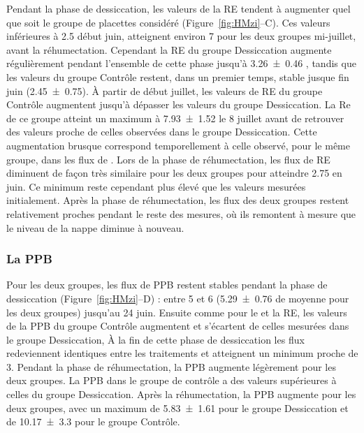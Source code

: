Pendant la phase de dessiccation, les valeurs de la RE tendent à augmenter quel que soit le groupe de placettes considéré (Figure~\ref{fig:HMzi}--C).
Ces valeurs inférieures à \SI{2.5}{\uml} début juin, atteignent environ \SI{7}{\uml} pour les deux groupes mi-juillet, avant la réhumectation.
Cependant la RE du groupe Dessiccation augmente régulièrement pendant l'ensemble de cette phase jusqu'à \SI{3.26(046)}{\uml} , tandis que les valeurs du groupe Contrôle restent, dans un premier temps, stable jusque fin juin (\SI{2.45(075)}{\uml}).
À partir de début juillet, les valeurs de RE du groupe Contrôle augmentent jusqu'à dépasser les valeurs du groupe Dessiccation.
La Re de ce groupe atteint un maximum à \SI{7.93(152)}{\uml} le 8 juillet avant de retrouver des valeurs proche de celles observées dans le groupe Dessiccation.
Cette augmentation brusque correspond temporellement à celle observé, pour le même groupe, dans les flux de \chh.
Lors de la phase de réhumectation, les flux de RE diminuent de façon très similaire pour les deux groupes pour atteindre \SI{2.75}{\uml} en juin.
Ce minimum reste cependant plus élevé que les valeurs mesurées initialement.
Après la phase de réhumectation, les flux des deux groupes restent relativement proches pendant le reste des mesures, où ils remontent à mesure que le niveau de la nappe diminue à nouveau.

\subsubsection{La PPB}

Pour les deux groupes, les flux de PPB restent stables pendant la phase de dessiccation (Figure~\ref{fig:HMzi}--D) :
entre 5 et \SI{6}{\uml} (\SI{5.29(076)}{\uml} de moyenne pour les deux groupes) jusqu'au 24 juin.
Ensuite comme pour le \chh et la RE, les valeurs de la PPB du groupe Contrôle augmentent et s'écartent de celles mesurées dans le groupe Dessiccation,
À la fin de cette phase de dessiccation les flux redeviennent identiques entre les traitements et atteignent un minimum proche de \SI{3}{\uml}.
Pendant la phase de réhumectation, la PPB augmente légèrement pour les deux groupes.
La PPB dans le groupe de contrôle a des valeurs supérieures à celles du groupe Dessiccation.
Après la réhumectation, la PPB augmente pour les deux groupes, avec un maximum de \SI{5.83(161)}{\uml} pour le groupe Dessiccation et de \SI{10.17(330)}{\uml} pour le groupe Contrôle.

